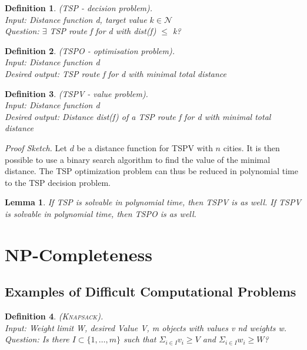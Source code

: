 \documentclass[a3paper, 8pt]{extarticle}
\newtheorem{lemma}[theorem]{Lemma}
\newtheorem*{definition}{Definition}
\begin{document}
\begin{multicols*}{6}
\begin{definition}
    (TSP - decision problem). \\Input: Distance function d, target value $k \in \mathcal{N}$\\
    Question: $\exists$ TSP route f for d with dist(f) $\leq$ k?
\end{definition}

\begin{definition}
    (TSPO - optimisation problem). \\Input: Distance function d\\
    Desired output: TSP route f for d with minimal total distance
\end{definition}

\begin{definition}
    (TSPV - value problem). \\Input: Distance function d\\
    Desired output: Distance dist(f) of a TSP route f for d with minimal total distance
\end{definition}
\textit{Proof Sketch.} Let $d$ be a distance function for TSPV with $n$ cities. It is then possible to use a binary search algorithm to find the value of the minimal distance. The TSP optimization problem can thus be reduced in polynomial time to the TSP decision problem.

\begin{lemma}
    If TSP is solvable in polynomial time, then TSPV is as well. If TSPV is solvable in polynomial time, then TSPO is as well.
   \end{lemma}
 
\section{NP-Completeness}

\subsection{Examples of Difficult Computational Problems}


\begin{definition}
    \textsc{(Knapsack)}.\\ Input: Weight limit W, desired Value V, m objects with values v nd weights w. \\
    Question: Is there $I \subset \{1, \dots , m\}$ such that $\Sigma_{i \in I} v_i\geq V$ and $\Sigma_{i \in I} w_i\geq W$?
\end{definition}


\end{multicols*}
\end{document}
